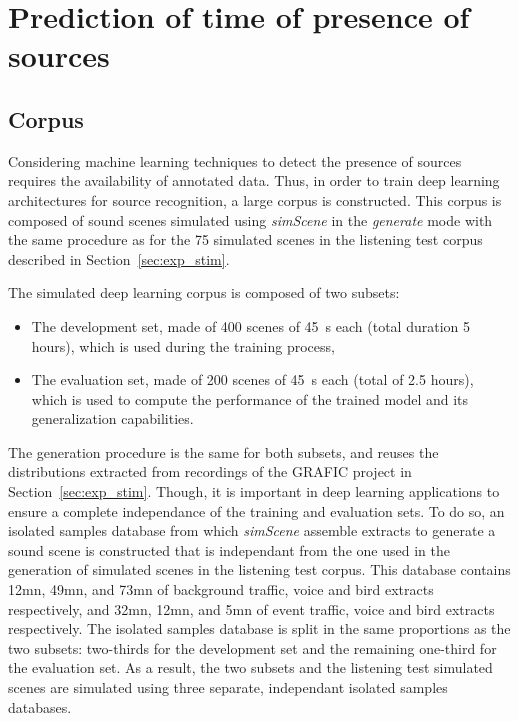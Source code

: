 \documentclass[twocolumn]{article}
\begin{document}
\section{Prediction of time of presence of sources}
\label{sec:pred}

\subsection{Corpus}
\label{sec:pred_corp}

Considering machine learning techniques to detect the presence of sources requires the availability of annotated data. Thus, in order to train deep learning architectures for source recognition, a large corpus is constructed. This corpus is composed of sound scenes simulated using \textit{simScene} in the \textit{generate} mode with the same procedure as for the 75 simulated scenes in the listening test corpus described in Section~\ref{sec:exp_stim}.

The simulated deep learning corpus is composed of two subsets:
\begin{itemize}
\item The development set, made of 400 scenes of 45~s each (total duration 5 hours), which is used during the training process,
\item The evaluation set, made of 200 scenes of 45~s each (total of 2.5 hours), which is used to compute the performance of the trained model and its generalization capabilities.
\end{itemize}

The generation procedure is the same for both subsets, and reuses the distributions extracted from recordings of the GRAFIC project in Section~\ref{sec:exp_stim}. Though, it is important in deep learning applications to ensure a complete independance of the training and evaluation sets. To do so, an isolated samples database from which \textit{simScene} assemble extracts to generate a sound scene is constructed that is independant from the one used in the generation of simulated scenes in the listening test corpus. This database contains 12mn, 49mn, and 73mn of background traffic, voice and bird extracts respectively, and 32mn, 12mn, and 5mn of event traffic, voice and bird extracts respectively. The isolated samples database is split in the same proportions as the two subsets: two-thirds for the development set and the remaining one-third for the evaluation set. As a result, the two subsets and the listening test simulated scenes are simulated using three separate, independant isolated samples databases.
\end{document}
